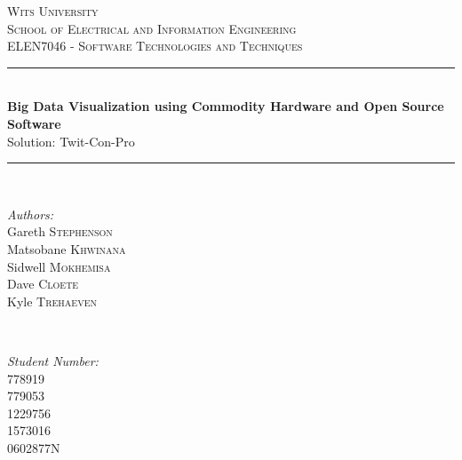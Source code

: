 \documentclass[12pt]{article} %
\begin{document}
	
	
	\begin{titlepage}
		
		\newcommand{\HRule}{\rule{\linewidth}{0.5mm}} %
		
		\center %
		
		\textsc{\LARGE Wits University}\\[1.5cm] %
		\textsc{\Large School of Electrical and Information Engineering}\\[0.5cm] %
		\textsc{\large ELEN7046 - Software Technologies and Techniques}\\[0.5cm] %
		
		\HRule \\[0.4cm]
		{ \huge \bfseries Big Data Visualization using Commodity Hardware and Open Source Software}\\[0.4cm] %
		
		Solution: Twit-Con-Pro
		
		\HRule \\[0.6cm]
		
		\begin{minipage}
			{0.4
				\textwidth} 
			\begin{flushleft}
				\large \emph{Authors:}\\
				Gareth \textsc{Stephenson} \\
				Matsobane \textsc{Khwinana} \\
				Sidwell \textsc{Mokhemisa} \\
				Dave \textsc{Cloete}\\
				Kyle \textsc{Trehaeven}
			\end{flushleft}
		\end{minipage}
		~ 
		\begin{minipage}
			{0.4
				\textwidth} 
			\begin{flushright}
				\large \emph{Student Number:} \\
				778919 \\
				779053  \\
				1229756 \\
				1573016 \\
				0602877N
			\end{flushright}
		\end{minipage}
		\\[1cm]
		\
		\\
		\
		\\
		\
		

\end{titlepage}
\end{document}
